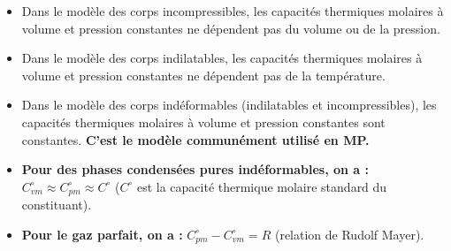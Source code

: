 \documentclass{article}
\begin{document}
\begin{remarque}
    \begin{itemize}
        \item Dans le modèle des corps incompressibles, les capacités thermiques molaires à volume et pression constantes ne dépendent pas du volume ou de la pression.
        \item Dans le modèle des corps indilatables, les capacités thermiques molaires à volume et pression constantes ne dépendent pas de la température.
        \item Dans le modèle des corps indéformables (indilatables et incompressibles), les capacités thermiques molaires à volume et pression constantes sont constantes. \textbf{C’est le modèle communément utilisé en MP.}
        \item \textbf{Pour des phases condensées pures indéformables, on a :} $C_{vm}^\circ \approx C_{pm}^\circ \approx C^\circ$  ($C^\circ$ est la capacité thermique molaire standard du constituant).
        \item \textbf{Pour le gaz parfait, on a :} $C_{pm}^\circ - C_{vm}^\circ = R$ (relation de Rudolf Mayer).
    \end{itemize}
\end{remarque}
\end{document}
